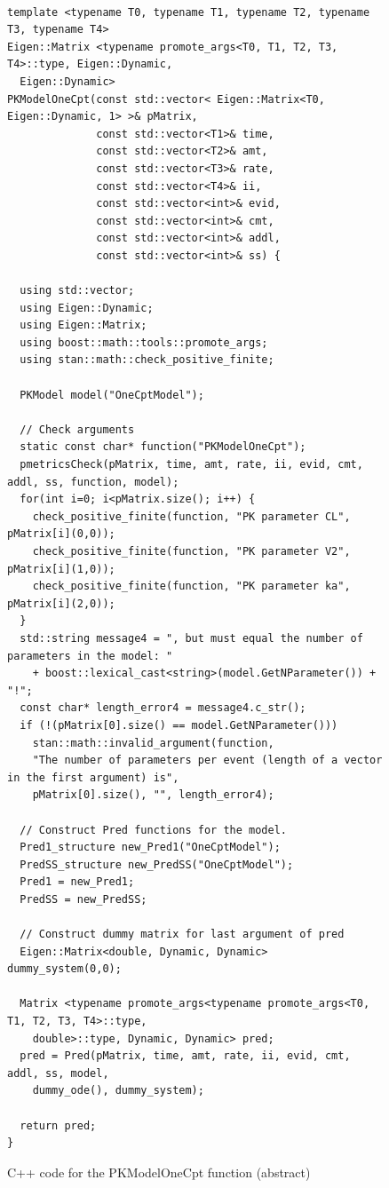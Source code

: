 \documentclass[11pt]{amsart}
\newenvironment{fmpage}[1]
     {\begin{lrbox}{\fmbox}\begin{minipage}{#1}}
     {\end{minipage}\end{lrbox}\fbox{\usebox{\fmbox}}}
\begin{document}
\begin{figure}
\caption{C++ code for the PKModelOneCpt function (abstract)}
\begin{center}
\begin{small}
\begin{fmpage}{\textwidth - .45in}
\begin{lstlisting}[basicstyle=\footnotesize\ttfamily,mathescape=true,flexiblecolumns=true,frame=single,escapeinside=`']

template <typename T0, typename T1, typename T2, typename T3, typename T4> 
Eigen::Matrix <typename promote_args<T0, T1, T2, T3, T4>::type, Eigen::Dynamic,
  Eigen::Dynamic> 
PKModelOneCpt(const std::vector< Eigen::Matrix<T0, Eigen::Dynamic, 1> >& pMatrix, 
			  const std::vector<T1>& time,
			  const std::vector<T2>& amt,
			  const std::vector<T3>& rate,
			  const std::vector<T4>& ii,
			  const std::vector<int>& evid,
			  const std::vector<int>& cmt,
			  const std::vector<int>& addl,
			  const std::vector<int>& ss) {
			  
  using std::vector;
  using Eigen::Dynamic;
  using Eigen::Matrix;
  using boost::math::tools::promote_args;
  using stan::math::check_positive_finite;
  
  PKModel model("OneCptModel"); 
  	 
  // Check arguments
  static const char* function("PKModelOneCpt");
  pmetricsCheck(pMatrix, time, amt, rate, ii, evid, cmt, addl, ss, function, model);
  for(int i=0; i<pMatrix.size(); i++) {
    check_positive_finite(function, "PK parameter CL", pMatrix[i](0,0));
    check_positive_finite(function, "PK parameter V2", pMatrix[i](1,0));
    check_positive_finite(function, "PK parameter ka", pMatrix[i](2,0));
  }
  std::string message4 = ", but must equal the number of parameters in the model: " 
    + boost::lexical_cast<string>(model.GetNParameter()) + "!"; 
  const char* length_error4 = message4.c_str();    
  if (!(pMatrix[0].size() == model.GetNParameter()))
    stan::math::invalid_argument(function,
    "The number of parameters per event (length of a vector in the first argument) is",
    pMatrix[0].size(), "", length_error4);

  // Construct Pred functions for the model.
  Pred1_structure new_Pred1("OneCptModel");
  PredSS_structure new_PredSS("OneCptModel");
  Pred1 = new_Pred1;
  PredSS = new_PredSS; 
  	
  // Construct dummy matrix for last argument of pred
  Eigen::Matrix<double, Dynamic, Dynamic> dummy_system(0,0);

  Matrix <typename promote_args<typename promote_args<T0, T1, T2, T3, T4>::type,
    double>::type, Dynamic, Dynamic> pred;
  pred = Pred(pMatrix, time, amt, rate, ii, evid, cmt, addl, ss, model,
    dummy_ode(), dummy_system);
    
  return pred;
}
\end{lstlisting}
\end{fmpage}
\end{small}
\end{center}
\label{C++ code for the PKModelOneCpt function}
\end{figure}
\end{document}
